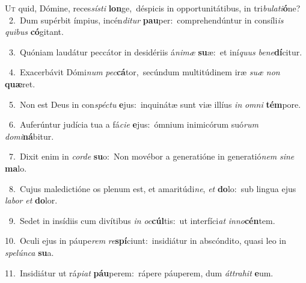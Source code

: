 \lettrine{\initial\textcolor{\initialcolor}{U}}{t} quid, Dómine, reces\-\textit{sís}\-\textit{ti} \textbf{lon}\-ge,~\star déspicis in opportunitátibus, in tri\-\textit{bu}\-\textit{la}\textit{ti}\textbf{ó}ne?\\
{\numbfont\textcolor{\numbcolor}{~2.}}~Dum supérbit ímpius, incén\-\textit{di}\-\textit{tur} \textbf{pau}\-per:~\star comprehendúntur in consíli\textit{is} \textit{qui}\-\textit{bus} \textbf{có}\-gitant.\par
{\numbfont\textcolor{\numbcolor}{~3.}}~Quóniam laudátur peccátor in desidériis á\-\textit{ni}\-\textit{mæ} \textbf{su}\-æ:~\star et iní\textit{quus} \textit{be}\-\textit{ne}\textbf{dí}citur.\par
{\numbfont\textcolor{\numbcolor}{~4.}}~Exacerbávit Dómi\textit{num} \textit{pec}\-\textbf{cá}tor,~\star secúndum multitúdinem iræ \textit{su}\-\textit{æ} \textit{non} \textbf{quæ}\-ret.\par
{\numbfont\textcolor{\numbcolor}{~5.}}~Non est Deus in con\-\textit{spéc}\-\textit{tu} \textbf{e}\-jus:~\star inquinátæ sunt viæ illíus \textit{in} \textit{om}\-\textit{ni} \textbf{tém}\-pore.\par
{\numbfont\textcolor{\numbcolor}{~6.}}~Auferúntur judícia tua a fá\-\textit{ci}\-\textit{e} \textbf{e}\-jus:~\star ómnium inimicórum suó\textit{rum} \textit{do}\-\textit{mi}\textbf{ná}bitur.\par
{\numbfont\textcolor{\numbcolor}{~7.}}~Dixit enim in \textit{cor}\-\textit{de} \textbf{su}\-o:~\star Non movébor a generatióne in generatió\textit{nem} \textit{si}\-\textit{ne} \textbf{ma}\-lo.\par
{\numbfont\textcolor{\numbcolor}{~8.}}~Cujus maledictióne os plenum est, et amaritúdi\-\textit{ne}\-, \textit{et} \textbf{do}\-lo:~\star sub lingua ejus \textit{la}\-\textit{bor} \textit{et} \textbf{do}\-lor.\par
{\numbfont\textcolor{\numbcolor}{~9.}}~Sedet in insídiis cum divítibus \textit{in} \textit{oc}\-\textbf{cúl}tis:~\star ut interfíci\textit{at} \textit{in}\-\textit{no}\textbf{cén}tem.\par
{\numbfont\textcolor{\numbcolor}{10.}}~Oculi ejus in páupe\textit{rem} \textit{re}\-\textbf{spí}ciunt:~\star insidiátur in abscóndito, quasi leo in \textit{spe}\-\textit{lún}\textit{ca} \textbf{su}\-a.\par
{\numbfont\textcolor{\numbcolor}{11.}}~Insidiátur ut rá\-\textit{pi}\-\textit{at} \textbf{páu}\-perem:~\star rápere páuperem, dum \textit{át}\-\textit{tra}\textit{hit} \textbf{e}\-um.\par
